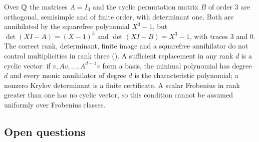 \begin{example}\label{sel:ex:rankthree}
Over $\mathbb{Q}$ the matrices $A=I_3$ and the cyclic permutation matrix $B$ of
order $3$ are orthogonal, semisimple and of finite order, with determinant
one. Both are annihilated by the squarefree polynomial $X^3-1$, but
$\det(XI-A)=(X-1)^3$ and $\det(XI-B)=X^3-1$, with traces $3$ and $0$. The
correct rank, determinant, finite image and a squarefree annihilator do not
control multiplicities in rank three
().
A sufficient replacement in any rank $d$ is a cyclic vector: if
$v,Av,\dots,A^{d-1}v$ form a basis, the minimal polynomial has degree $d$
and every monic annihilator of degree $d$ is the characteristic polynomial;
a nonzero Krylov determinant is a finite certificate. A scalar Frobenius in
rank greater than one has no cyclic vector, so this condition cannot be
assumed uniformly over Frobenius classes.
\end{example}

\subsection{Open questions}\label{sel:sec:open}

